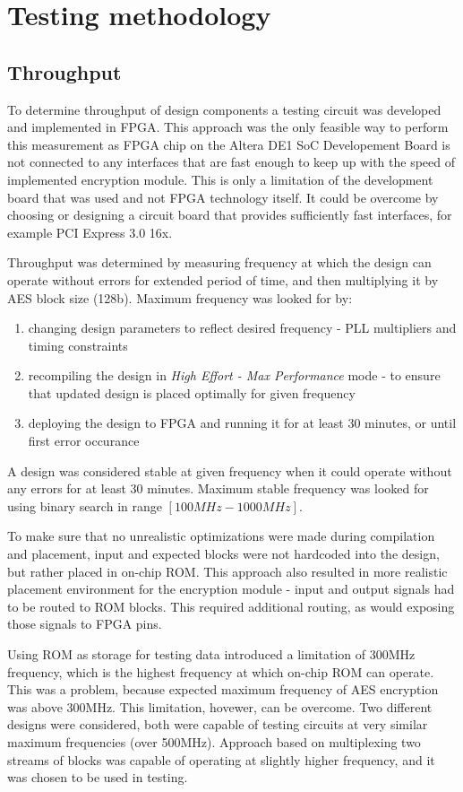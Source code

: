 \section{Testing methodology}
\label{sec:testing-methodology}

\subsection{Throughput}
To determine throughput of design components a testing circuit was developed and implemented in FPGA. This approach was the only feasible way to perform this measurement as FPGA chip on the Altera DE1 SoC Developement Board is not connected to any interfaces that are fast enough to keep up with the speed of implemented encryption module. This is only a limitation of the development board that was used and not FPGA technology itself. It could be overcome by choosing or designing a circuit board that provides sufficiently fast interfaces, for example PCI Express 3.0 16x.

Throughput was determined by measuring frequency at which the design can operate without errors for extended period of time, and then multiplying it by AES block size (128b). Maximum frequency was looked for by:
\begin{enumerate}[nolistsep]
\item changing design parameters to reflect desired frequency - PLL multipliers and timing constraints
\item recompiling the design in \textit{High Effort - Max Performance} mode - to ensure that updated design is placed optimally for given frequency
\item deploying the design to FPGA and running it for at least 30 minutes, or until first error occurance
\end{enumerate}
A design was considered stable at given frequency when it could operate without any errors for at least 30 minutes. Maximum stable frequency was looked for using binary search in range $[100MHz - 1000MHz]$. 

To make sure that no unrealistic optimizations were made during compilation and placement, input and expected blocks were not hardcoded into the design, but rather placed in on-chip ROM. This approach also resulted in more realistic placement environment for the encryption module - input and output signals had to be routed to ROM blocks. This required additional routing, as would exposing those signals to FPGA pins. 

Using ROM as storage for testing data introduced a limitation of 300MHz frequency, which is the highest frequency at which on-chip ROM can operate. This was a problem, because expected maximum frequency of AES encryption was above 300MHz. This limitation, hovewer, can be overcome. Two different designs were considered, both were capable of testing circuits at very similar maximum frequencies (over 500MHz). Approach based on multiplexing two streams of blocks was capable of operating at slightly higher frequency, and it was chosen to be used in testing.


